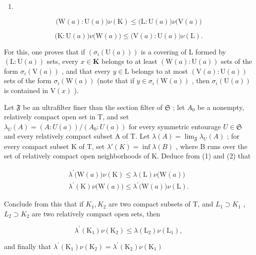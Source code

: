 \begin{enumerate}
\def\labelenumi{(\arabic{enumi})}
\tightlist
\item
\end{enumerate}

\[
\big (\mathrm{W} (a): \mathrm{U} (a) \big) \nu (\mathrm{K}) \leqslant \big (\mathrm{L}: \mathrm{U} (a) \big) \nu \big (\mathrm{V} (a) \big)\tag{2}
\]

\[
\bigl (\mathrm{K}: \mathrm{U} (a) \bigr) \nu \bigl (\mathrm{W} (a) \bigr) \leqslant \bigl (\mathrm{V} (a): \mathrm{U} (a) \bigr) \nu (\mathrm{L}).
\]

For this, one proves that if \((\sigma_i(\mathrm{U}(a)))\) is a covering of L formed by \((\mathrm{L}:\mathrm{U}(a))\) sets, every \(x\in \mathbf{K}\) belongs to at least \((\mathrm{W}(a):\mathrm{U}(a))\) sets of the form \(\sigma_{i}(\mathrm{V}(a))\) , and that every \(y\in \mathrm{L}\) belongs to at most \((\mathrm{V}(a):\mathrm{U}(a))\) sets of the form \(\sigma_{i}(\mathrm{W}(a))\) (note that if \(y\in \sigma_i(\mathrm{W}(a))\) , then \(\sigma_{i}(\mathrm{U}(a))\) is contained in \(\mathrm{V}(x)\) ).

Let \(\mathfrak{F}\) be an ultrafilter finer than the section filter of \(\mathfrak{S}\) ; let \(A_0\) be a nonempty, relatively compact open set in T, and set \(\lambda_U(A) = (A: U(a)) / (A_0: U(a))\) for every symmetric entourage \(U \in \mathfrak{S}\) and every relatively compact subset A of T. Let \(\lambda(A) = \lim_{\mathfrak{F}} \lambda_U(A)\) ; for every compact subset K of T, set \(\lambda'(K) = \inf \lambda(B)\) , where B runs over the set of relatively compact open neighborhoods of K. Deduce from (1) and (2) that

\[
\begin{array}{r} \lambda^ {\prime} \big (\mathrm{W} (a) \big) \nu (\mathrm{K}) \leqslant \lambda (\mathrm{L}) \nu \big (\mathrm{W} (a) \big) \\ \lambda^ {\prime} (\mathrm{K}) \nu \big (\mathrm{W} (a) \big) \leqslant \lambda^ {\prime} \big (\mathrm{W} (a) \big) \nu (\mathrm{L}). \end{array}
\]

Conclude from this that if \(K_{1}, K_{2}\) are two compact subsets of T, and \(L_{1} \supset K_{1}\) , \(L_{2} \supset K_{2}\) are two relatively compact open sets, then

\[
\lambda^ {\prime} (\mathrm{K} _ {1}) \nu (\mathrm{K} _ {2}) \leqslant \lambda (\mathrm{L} _ {2}) \nu (\mathrm{L} _ {1}),
\]

and finally that \(\lambda^{\prime}(\mathrm{K}_{1})\nu (\mathrm{K}_{2}) = \lambda^{\prime}(\mathrm{K}_{2})\nu (\mathrm{K}_{1})\)

